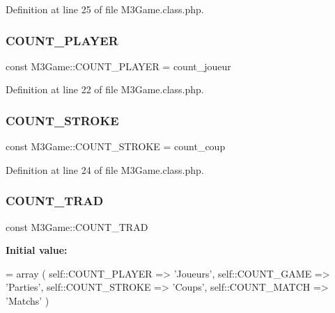 Definition at line 25 of file M3\+Game.\+class.\+php.

\mbox{\label{class_m3_game_a6bfae016f5eb538accd9f4395724c749}} 
\subsubsection{\texorpdfstring{C\+O\+U\+N\+T\+\_\+\+P\+L\+A\+Y\+ER}{COUNT\_PLAYER}}
{\footnotesize\ttfamily const M3\+Game\+::\+C\+O\+U\+N\+T\+\_\+\+P\+L\+A\+Y\+ER = \textquotesingle{}count\+\_\+joueur\textquotesingle{}}



Definition at line 22 of file M3\+Game.\+class.\+php.

\mbox{\label{class_m3_game_aa95f99c254f8dc3f5be158f781c04df3}} 
\subsubsection{\texorpdfstring{C\+O\+U\+N\+T\+\_\+\+S\+T\+R\+O\+KE}{COUNT\_STROKE}}
{\footnotesize\ttfamily const M3\+Game\+::\+C\+O\+U\+N\+T\+\_\+\+S\+T\+R\+O\+KE = \textquotesingle{}count\+\_\+coup\textquotesingle{}}



Definition at line 24 of file M3\+Game.\+class.\+php.

\mbox{\label{class_m3_game_af1338c69b83867a23c5221450e309687}} 
\subsubsection{\texorpdfstring{C\+O\+U\+N\+T\+\_\+\+T\+R\+AD}{COUNT\_TRAD}}
{\footnotesize\ttfamily const M3\+Game\+::\+C\+O\+U\+N\+T\+\_\+\+T\+R\+AD}

{\bfseries Initial value\+:}
\begin{DoxyCode}
= array (
        self::COUNT\_PLAYER => \textcolor{stringliteral}{'Joueurs'},
        self::COUNT\_GAME   => \textcolor{stringliteral}{'Parties'},
        self::COUNT\_STROKE => \textcolor{stringliteral}{'Coups'},
        self::COUNT\_MATCH  => \textcolor{stringliteral}{'Matchs'}
    )
\end{DoxyCode}


